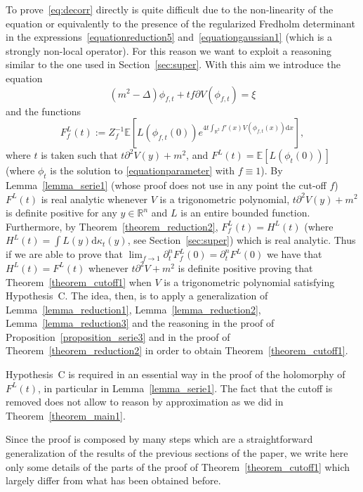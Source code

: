 \documentclass[a4paper,10pt]{article}
\newcommand{\assign}{:=}
\newcommand{\mathd}{\mathrm{d}}
\begin{document}
To prove~{\eqref{eq:decorr}} directly is quite difficult due to the
non-linearity of the equation or equivalently to the presence of the
regularized Fredholm determinant in the
expressions~{\eqref{equationreduction5}} and~{\eqref{equationgaussian1}}
(which is a strongly non-local operator). For this reason we want to exploit a
reasoning similar to the one used in Section~\ref{sec:super}. With this aim we
introduce the equation
\begin{equation}
  (m^2 - \Delta) \phi_{f, t} + t f \partial V (\phi_{f, t}) = \xi
  \label{equationparameter}
\end{equation}
and the functions
\[ F^L_f (t) \assign Z_f^{- 1} \mathbb{E} \left[ L (\phi_{f, t} (0)) e^{4 t
   \int_{\mathbb{R}^2} f' (x) V (\phi_{f, t} (x)) \mathd x} \right], \]
where $t$ is taken such that $t \partial^2 V (y) + m^2$, and $F^L (t)
=\mathbb{E} [L (\phi_t (0))]$ (where $\phi_t$ is the solution to
{\eqref{equationparameter}} with $f \equiv 1$). By Lemma~\ref{lemma_serie1}
(whose proof does not use in any point the cut-off $f$) $F^L (t)$ is real
analytic whenever $V$ is a trigonometric polynomial, $t \partial^2 V (y) +
m^2$ is definite positive for any $y \in \mathbb{R}^n$ and $L$ is an entire
bounded function. Furthermore, by Theorem~\ref{theorem_reduction2}, $F^L_f (t)
= H^L (t)$ (where $H^L (t) = \int L (y) \mathd \kappa_t (y)$, see
Section~\ref{sec:super}) which is real analytic. Thus if we are able to prove
that $\lim_{f \rightarrow 1} \partial^n_t F^L_f (0) = \partial^n_t F^L (0)$ we
have that $H^L (t) = F^L (t)$ whenever $t \partial^2 V + m^2$ is definite
positive proving that Theorem~\ref{theorem_cutoff1} when $V$ is a
trigonometric polynomial satisfying Hypothesis~C. The idea, then, is to apply
a generalization of Lemma~\ref{lemma_reduction1},
Lemma~\ref{lemma_reduction2}, Lemma~\ref{lemma_reduction3} and the reasoning
in the proof of Proposition~\ref{proposition_serie3} and in the proof of
Theorem~\ref{theorem_reduction2} in order to obtain
Theorem~\ref{theorem_cutoff1}.

\begin{remark}
  Hypothesis~C is required in an essential way in the proof of the holomorphy
  of $F^L (t)$, in particular in Lemma~\ref{lemma_serie1}. The fact that the
  cutoff is removed does not allow to reason by approximation as we did in
  Theorem~\ref{theorem_main1}. 
\end{remark}

Since the proof is composed by many steps which are a straightforward
generalization of the results of the previous sections of the paper, we write
here only some details of the parts of the proof of
Theorem~\ref{theorem_cutoff1} which largely differ from what has been obtained
before.
\end{document}
